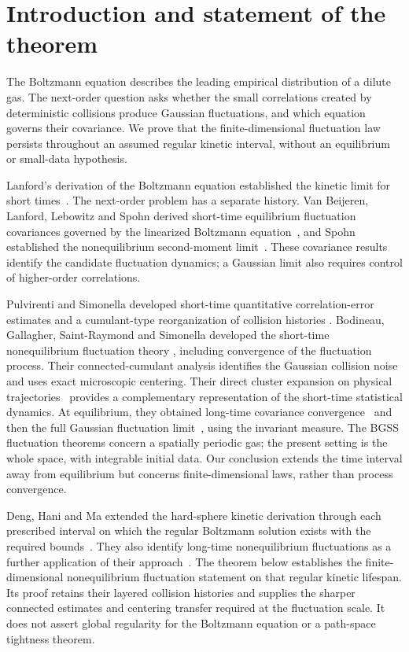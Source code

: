 \section{Introduction and statement of the theorem}\label{sec:introduction}

The Boltzmann equation describes the leading empirical distribution of a
dilute gas. The next-order question asks whether the small correlations
created by deterministic collisions produce Gaussian fluctuations, and
which equation governs their covariance. We prove that the finite-dimensional
fluctuation law persists throughout an assumed regular kinetic interval,
without an equilibrium or small-data hypothesis.

Lanford's derivation of the Boltzmann equation established the kinetic
limit for short times~\cite{Lanford1975}. The next-order problem has a
separate history. Van Beijeren, Lanford, Lebowitz and Spohn derived
short-time equilibrium fluctuation covariances governed by the linearized
Boltzmann equation~\cite{vanBeijerenLanfordLebowitzSpohn1980}, and
Spohn established the nonequilibrium second-moment
limit~\cite{Spohn1981}. These covariance results identify the candidate
fluctuation dynamics; a Gaussian limit also requires control of
higher-order correlations.

Pulvirenti and Simonella developed short-time quantitative correlation-error
estimates and a cumulant-type reorganization of collision histories
\cite{PulvirentiSimonella2017}. Bodineau, Gallagher, Saint-Raymond and
Simonella developed the short-time nonequilibrium fluctuation theory
\cite{BGSS2020,BGSS2023}, including convergence of the fluctuation
process. Their connected-cumulant analysis identifies the Gaussian
collision noise and uses exact microscopic centering. Their direct
cluster expansion on physical trajectories~\cite{BGSSCluster2022}
provides a complementary representation of the short-time statistical
dynamics. At equilibrium, they obtained long-time covariance
convergence~\cite{BGSSCorrelations2023} and then the full Gaussian
fluctuation limit~\cite{BGSS2024}, using the invariant measure.
The BGSS fluctuation theorems concern a spatially periodic gas;
the present setting is the whole space, with integrable initial data.
Our conclusion extends the time interval away from equilibrium but
concerns finite-dimensional laws, rather than process convergence.

Deng, Hani and Ma extended the hard-sphere kinetic derivation through
each prescribed interval on which the regular Boltzmann solution
exists with the required bounds~\cite{DHM2025}. They also identify
long-time nonequilibrium fluctuations as a further application of
their approach~\cite[Section~1.4.3]{DHM2025}. The theorem below
establishes the finite-dimensional nonequilibrium fluctuation statement
on that regular kinetic lifespan. Its proof retains their layered
collision histories and supplies the sharper connected estimates and
centering transfer required at the fluctuation scale. It does not
assert global regularity for the Boltzmann equation or a path-space
tightness theorem.

